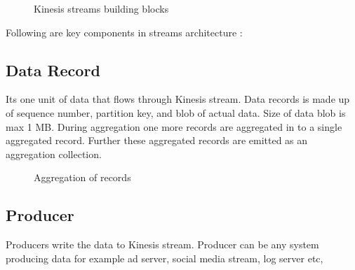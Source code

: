 \documentclass[9pt,twocolumn,twoside]{../../styles/osajnl}
\begin{document}
\begin{figure}[htbp]
\centering
{}
\caption{Kinesis streams building blocks} \cite{www-kinesis-arch}
\label{fig:false-color}
\end{figure}

Following are key components in streams architecture \cite{www-kinesis-arch} :
\subsection{Data Record}
Its one unit of data that flows through Kinesis stream. Data records is made up of sequence number, partition key, and blob of actual data. Size of data blob is max 1 MB. During aggregation one more records are aggregated in to a single aggregated record. Further these aggregated records are emitted as an aggregation collection.

\begin{figure}[htbp]
\centering
{}
\caption{Aggregation of records}
\label{fig:false-color}
\end{figure}

\subsection{Producer}
Producers write the data to Kinesis stream. Producer can be any system producing data for example ad server, social media stream, log server etc,
\end{document}
